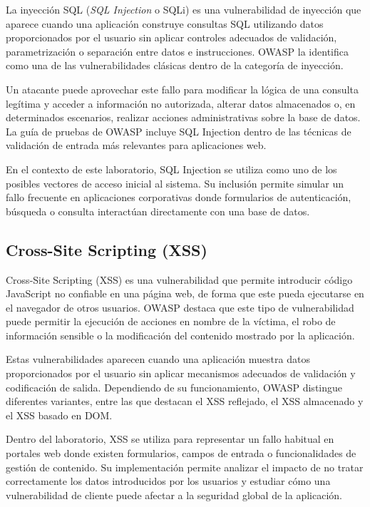 La inyección SQL (\textit{SQL Injection} o SQLi) es una vulnerabilidad de inyección que aparece cuando una aplicación construye consultas SQL utilizando datos proporcionados por el usuario sin aplicar controles adecuados de validación, parametrización o separación entre datos e instrucciones. OWASP la identifica como una de las vulnerabilidades clásicas dentro de la categoría de inyección.

Un atacante puede aprovechar este fallo para modificar la lógica de una consulta legítima y acceder a información no autorizada, alterar datos almacenados o, en determinados escenarios, realizar acciones administrativas sobre la base de datos. La guía de pruebas de OWASP incluye SQL Injection dentro de las técnicas de validación de entrada más relevantes para aplicaciones web.

En el contexto de este laboratorio, SQL Injection se utiliza como uno de los posibles vectores de acceso inicial al sistema. Su inclusión permite simular un fallo frecuente en aplicaciones corporativas donde formularios de autenticación, búsqueda o consulta interactúan directamente con una base de datos.


\subsection{Cross-Site Scripting (XSS)}

Cross-Site Scripting (XSS) es una vulnerabilidad que permite introducir código JavaScript no confiable en una página web, de forma que este pueda ejecutarse en el navegador de otros usuarios. OWASP destaca que este tipo de vulnerabilidad puede permitir la ejecución de acciones en nombre de la víctima, el robo de información sensible o la modificación del contenido mostrado por la aplicación.

Estas vulnerabilidades aparecen cuando una aplicación muestra datos proporcionados por el usuario sin aplicar mecanismos adecuados de validación y codificación de salida. Dependiendo de su funcionamiento, OWASP distingue diferentes variantes, entre las que destacan el XSS reflejado, el XSS almacenado y el XSS basado en DOM.

Dentro del laboratorio, XSS se utiliza para representar un fallo habitual en portales web donde existen formularios, campos de entrada o funcionalidades de gestión de contenido. Su implementación permite analizar el impacto de no tratar correctamente los datos introducidos por los usuarios y estudiar cómo una vulnerabilidad de cliente puede afectar a la seguridad global de la aplicación.

